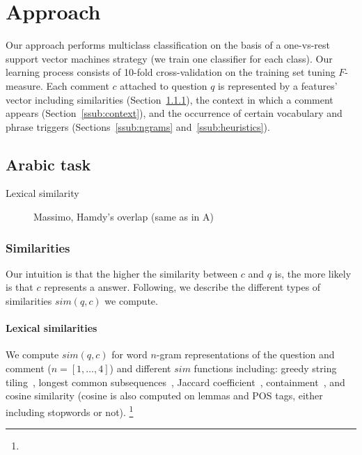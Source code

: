 \section{Approach}
\label{sec:approach}

Our approach performs multiclass classification on the basis of a one-vs-rest 
support vector machines strategy (\ie we train one classifier for each class). 
Our learning process consists of 10-fold cross-validation on the training set 
tuning $F$-measure. 
\blue{\ldots} 
Each comment $c$ attached to question $q$ is represented by a features' vector 
including similarities (Section~\ref{ssub:sim}), the context in which a comment 
appears (Section~\ref{ssub:context}), and the occurrence of certain vocabulary 
and phrase triggers (Sections~\ref{ssub:ngrams} and~\ref{ssub:heuristics}). 


\subsection{Arabic task}
\label{sub:app_arabic}

\begin{description}
 \item[Lexical similarity]  Massimo, Hamdy's overlap (same as in A) 
\end{description}


\subsubsection{Similarities}
\label{ssub:sim}

Our intuition is that the higher the similarity between $c$ and $q$ is, the 
more likely is that $c$ represents a \good answer. Following, we describe the 
different types of similarities $sim(q,c)$ we compute.

\paragraph{Lexical similarities}
We compute $sim(q, c)$ for word $n$-gram representations of the question and 
comment ($n=[1,\ldots,4]$) and different $sim$ functions including: greedy 
string tiling~, longest common subsequences~, Jaccard 
coefficient~\cite{Jaccard:1901}, containment~, and cosine similarity 
(cosine is also computed on lemmas and POS tags, either including stopwords or 
not).%
\footnote{}


